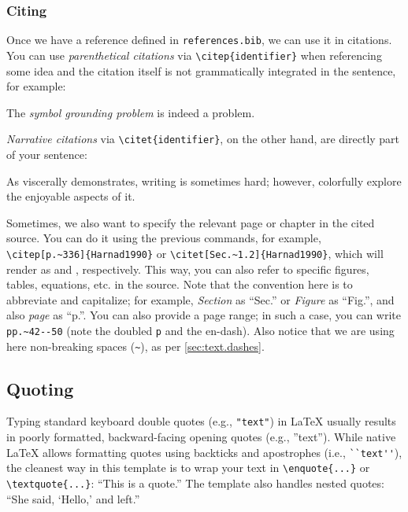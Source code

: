 \subsubsection*{Citing}

Once we have a reference defined in \verb|references.bib|, we can use it in citations. You can use
\emph{parenthetical citations} via \verb|\citep{identifier}| when referencing some idea and the citation itself is
not grammatically integrated in the sentence, for example:
\begin{displayquote}
    The \emph{symbol grounding problem} \citep{Harnad1990} is indeed a problem.
\end{displayquote}
\emph{Narrative citations} via \verb|\citet{identifier}|, on the other hand, are directly part of your sentence:
\begin{displayquote}
    As \citet{Upper1974} viscerally demonstrates, writing is sometimes hard; however, \citet{Thebaud2017} colorfully
    explore the enjoyable aspects of it.
\end{displayquote}

Sometimes, we also want to specify the relevant page or chapter in the cited source. You can do it using the previous
commands, for example, \verb|\citep[p.~336]{Harnad1990}| or \verb|\citet[Sec.~1.2]{Harnad1990}|, which will render as
\citep[p.~336]{Harnad1990} and \citet[Sec.~1.2]{Harnad1990}, respectively. This way, you can also refer to specific
figures, tables, equations, etc. in the source. Note that the convention here is to abbreviate and capitalize; for
example, \emph{Section} as \enquote{Sec.} or \emph{Figure} as \enquote{Fig.}, and also \emph{page} as \enquote{p.}.
You can also provide a page range; in such a case, you can write \verb|pp.~42--50| (note the doubled \verb|p| and the
en-dash). Also notice that we are using here non-breaking spaces (\verb|~|), as per \cref{sec:text.dashes}.

\subsection{Quoting}

Typing standard keyboard double quotes (e.g., \verb|"text"|) in \LaTeX{} usually results in poorly formatted,
backward-facing opening quotes (e.g., ''text''). While native \LaTeX{} allows formatting quotes using backticks and
apostrophes (i.e., \verb|``text''|), the cleanest way in this template is to wrap your text in \verb|\enquote{...}|
or \verb|\textquote{...}|:
\enquote{This is a quote.} The template also handles nested quotes: \enquote{She said, \enquote{Hello,} and left.}

